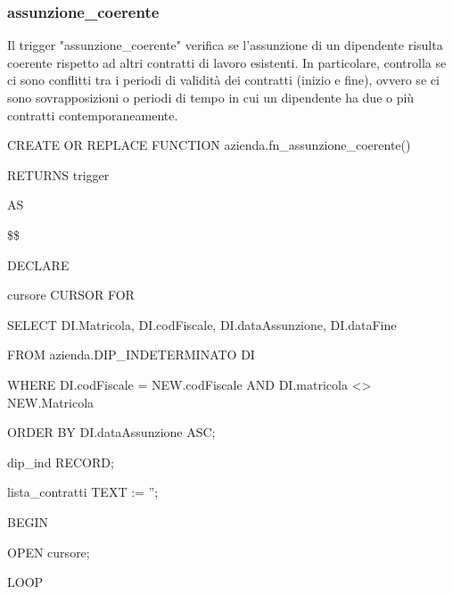         \subsubsection{assunzione\_coerente}
        Il trigger "assunzione\_coerente" verifica se l'assunzione di un dipendente risulta coerente rispetto ad altri contratti di lavoro esistenti. In particolare, controlla se ci sono conflitti tra i periodi di validità dei contratti (inizio e fine), ovvero se ci sono sovrapposizioni o periodi di tempo in cui un dipendente ha due o più contratti contemporaneamente.
        \ttfamily
            \begin{flushleft}
                \begin{description}
                    \item CREATE OR REPLACE FUNCTION azienda.fn\_assunzione\_coerente()  
                    \item RETURNS trigger
                    \item AS
                    \item \$\$
                    \item DECLARE
                        \begin{description}
                            \item cursore CURSOR FOR
                            \begin{description}
                                \item SELECT DI.Matricola, DI.codFiscale, DI.dataAssunzione, DI.dataFine
                                \item FROM azienda.DIP\_INDETERMINATO DI
                                \item WHERE DI.codFiscale = NEW.codFiscale AND DI.matricola <> NEW.Matricola
                                \item ORDER BY DI.dataAssunzione ASC;
                            \end{description}
                            \item dip\_ind RECORD;
                            \item lista\_contratti TEXT := '';
                        \end{description}
                    \item BEGIN 
                    \begin{description}
                            \item OPEN cursore;
                            \item LOOP


\end{description}
\end{description}
\end{flushleft}
